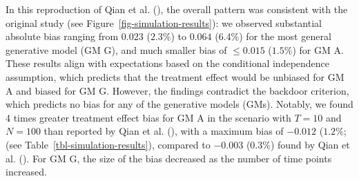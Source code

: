 \documentclass[
  11pt,
  a4paper,
]{article}
\begin{document}
\begin{figure}[H]
\begin{minipage}{0.50\linewidth}
{}

\end{minipage}%
%
\begin{minipage}{0.50\linewidth}



\end{minipage}%

\end{figure}%

In this reproduction of Qian et al. (), the
overall pattern was consistent with the original study (see
Figure~\ref{fig-simulation-results}): we observed substantial absolute
bias ranging from \(0.023\) (\(2.3\%\)) to \(0.064\) (\(6.4\%\)) for the
most general generative model (GM G), and much smaller bias of
\(\leq 0.015\) (\(1.5\%\)) for GM A. These results align with
expectations based on the conditional independence assumption, which
predicts that the treatment effect would be unbiased for GM A and biased
for GM G. However, the findings contradict the backdoor criterion, which
predicts no bias for any of the generative models (GMs). Notably, we
found 4 times greater treatment effect bias for GM A in the scenario
with \(T = 10\) and \(N = 100\) than reported by Qian et al.
(), with a maximum bias of \(-0.012\)
(\(1.2\%\); (see Table~\ref{tbl-simulation-results}), compared to
\(-0.003\) (\(0.3\%\)) found by Qian et al.
(). For GM G, the size of the bias
decreased as the number of time points increased.
\end{document}
